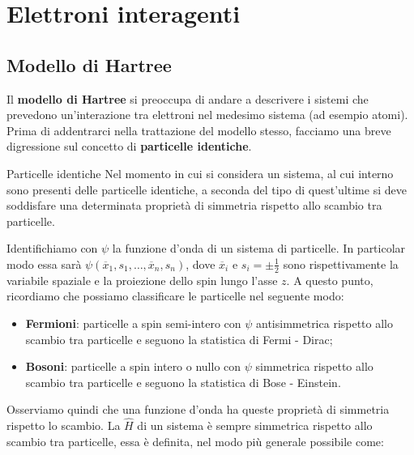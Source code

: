 \chapter{Elettroni interagenti}



\section{Modello di Hartree}

Il \textbf{modello di Hartree} si preoccupa di andare a descrivere i sistemi che prevedono un'interazione tra elettroni nel medesimo sistema (ad esempio atomi). Prima di addentrarci nella trattazione del modello stesso, facciamo una breve digressione sul concetto di \textbf{particelle identiche}.

\begin{definition}{Particelle identiche}
    Nel momento in cui si considera un sistema, al cui interno sono presenti delle particelle identiche, a seconda del tipo di quest'ultime si deve soddisfare una determinata proprietà di simmetria rispetto allo scambio tra particelle.
\end{definition}

\noindent Identifichiamo con $\psi$ la funzione d'onda di un sistema di particelle. In particolar modo essa sarà $\psi(\overline{x}_1, s_1, \dots, \overline{x}_n, s_n)$, dove $\overline x_i$ e $s_i=\pm \frac 12$ sono rispettivamente la variabile spaziale e la proiezione dello spin lungo l'asse $z$. A questo punto, ricordiamo che possiamo classificare le particelle nel seguente modo:
\begin{itemize}
    \item \textbf{Fermioni}: particelle a spin semi-intero con $\psi$ antisimmetrica rispetto allo scambio tra particelle e seguono la statistica di Fermi - Dirac;
    \item \textbf{Bosoni}: particelle a spin intero o nullo con $\psi$ simmetrica rispetto allo scambio tra particelle e seguono la statistica di Bose - Einstein.
\end{itemize}

\noindent Osserviamo quindi che una funzione d'onda ha queste proprietà di simmetria rispetto lo scambio. La $\hat H$ di un sistema è sempre simmetrica rispetto allo scambio tra particelle, essa è definita, nel modo più generale possibile come:

